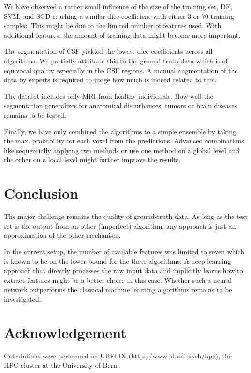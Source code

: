 \documentclass[journal]{IEEEtran}
\begin{document}
We have observed a rather small influence of the size of the training set, DF, SVM, and SGD reaching a similar dice coefficient with either 3 or 70 training samples. This might be due to the limited number of features used. With additional features, the amount of training data might become more important.

The segmentation of CSF yielded the lowest dice coefficients across all algorithms. We partially attribute this to the ground truth data which is of equivocal quality especially in the CSF regions. A manual augmentation of the data by experts is required to judge how much is indeed related to this.

The dataset includes only MRI from healthy individuals. How well the segmentation generalizes for anatomical disturbances, tumors or brain diseases remains to be tested.

Finally, we have only combined the algorithms to a simple ensemble by taking the max. probability for each voxel from the predictions. Advanced combinations like sequentially applying two methods or use one method on a global level and the other on a local level might further improve the results.

\section{Conclusion}
The major challenge remains the quality of ground-truth data. As long as the test set is the output from an other (imperfect) algorithm, any approach is just an approximation of the other mechanism.

In the current setup, the number of available features was limited to seven which is known to be on the lower bound for the these algorithms. A deep learning approach that directly processes the raw input data and implicitly learns how to extract features might be a better choice in this case. Whether such a neural network outperforms the classical machine learning algorithms remains to be investigated.

\section*{Acknowledgement}
Calculations were performed on UBELIX (http://www.id.unibe.ch/hpc), the HPC cluster at the University of Bern.



\end{document}
